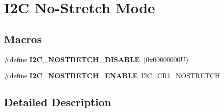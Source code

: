 \hypertarget{group___i2_c___n_o_s_t_r_e_t_c_h___m_o_d_e}{}\section{I2C No-\/\+Stretch Mode}
\label{group___i2_c___n_o_s_t_r_e_t_c_h___m_o_d_e}
\subsection*{Macros}
\begin{DoxyCompactItemize}
\item 
\mbox{\label{group___i2_c___n_o_s_t_r_e_t_c_h___m_o_d_e_ga611deefe89e56fa65f853e6796f2cf66}} 
\#define {\bfseries I2\+C\+\_\+\+N\+O\+S\+T\+R\+E\+T\+C\+H\+\_\+\+D\+I\+S\+A\+B\+LE}~(0x00000000\+U)
\item 
\mbox{\label{group___i2_c___n_o_s_t_r_e_t_c_h___m_o_d_e_ga67ebace1182d99bb5d7968994c01c80e}} 
\#define {\bfseries I2\+C\+\_\+\+N\+O\+S\+T\+R\+E\+T\+C\+H\+\_\+\+E\+N\+A\+B\+LE}~\mbox{\hyperlink{group___peripheral___registers___bits___definition_ga197aaca79f64e832af3a0a0864c2a08c}{I2\+C\+\_\+\+C\+R1\+\_\+\+N\+O\+S\+T\+R\+E\+T\+CH}}
\end{DoxyCompactItemize}


\subsection{Detailed Description}
